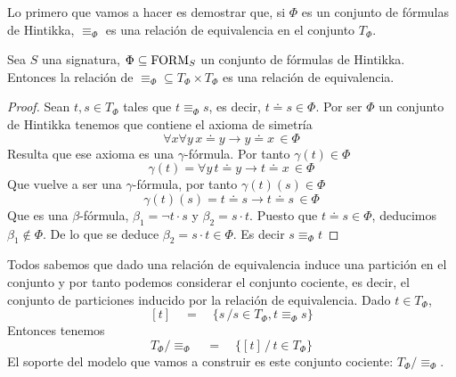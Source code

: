 Lo primero que vamos a hacer es demostrar que, si $\Phi$ es un conjunto de fórmulas de Hintikka, $\equiv_{\Phi}$ es una relación de equivalencia en el conjunto $T_{\Phi}$.

\begin{prop}
  Sea $S$ una signatura, $\Phi\subseteq\mbox{FORM}_{S}$ un conjunto de fórmulas de Hintikka. Entonces la relación de $\equiv_{\Phi}\subseteq T_{\Phi}\times T_{\Phi}$ es una relación de equivalencia.
  \begin{proof}
    Sean $t,s\in T_{\Phi}$ tales que $t\equiv_{\Phi} s$, es decir, $t\doteq s\in\Phi$. Por ser $\Phi$ un conjunto de Hintikka tenemos que contiene el axioma de simetría
    \[ \forall x \forall y\, x\doteq y\rightarrow y\doteq x \, \in\Phi \]
    Resulta que ese axioma es una $\gamma$-fórmula. Por tanto $\gamma(t)\in\Phi$
    \[ \gamma(t)= \forall y \, t \doteq y \rightarrow t\doteq x\, \in\Phi \]
    Que vuelve a ser una $\gamma$-fórmula, por tanto $\gamma(t)(s)\in\Phi$
    \[ \gamma(t)(s) = t\doteq s\rightarrow t\doteq s\, \in\Phi \]
    Que es una $\beta$-fórmula, $\beta_{1}=\neg t\cdot s$ y $\beta_{2}= s\cdot t$. Puesto que $t\doteq s\in\Phi$, deducimos $\beta_{1}\not\in\Phi$. De lo que se deduce $\beta_{2}=s\cdot t\in\Phi$. Es decir $s\equiv_{\Phi}t$
\end{proof}
\end{prop}

Todos sabemos que dado una relación de equivalencia induce una partición en el conjunto y por tanto podemos considerar el conjunto cociente, es decir, el conjunto de particiones inducido por la relación de equivalencia. Dado $t\in T_{\Phi}$,
\[ [t]\quad=\quad\{s\, / s \in T_{\Phi}, t\equiv_{\Phi} s \} \]
Entonces tenemos
\[ T_{\Phi}/\equiv_{\Phi}\quad = \quad \{[t]\, / \, t\in T_{\Phi}\} \]
El soporte del modelo que vamos a construir es este conjunto cociente: $T_{\Phi}/\equiv_{\Phi}$.

